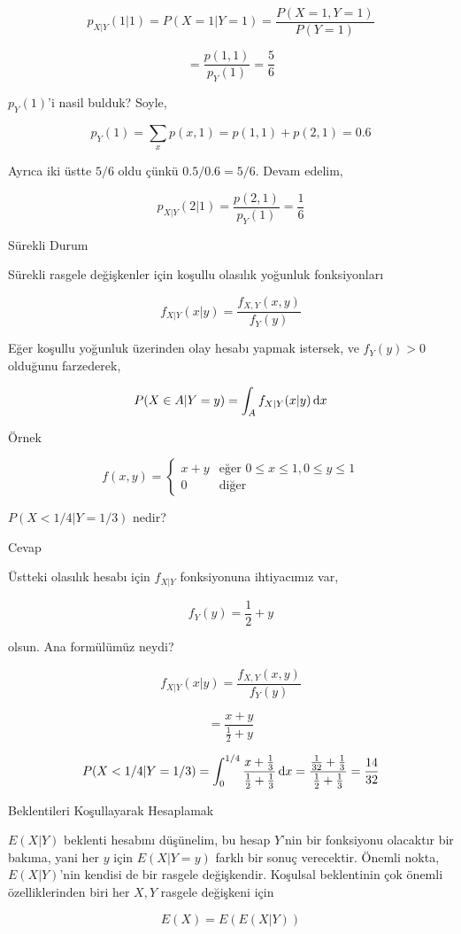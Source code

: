 \documentclass[12pt,fleqn]{article}\usepackage{../../common}
\begin{document}
$$ p_{X|Y}(1|1) = P(X=1|Y=1) = \frac{P(X=1,Y=1)}{P(Y=1)}
$$

$$ = \frac{p(1,1)}{p_Y(1)} = \frac{5}{6} $$

$p_Y(1)$'i nasil bulduk? Soyle,

$$ p_Y(1) = \sum_x p(x,1) = p(1,1) + p(2,1) = 0.6 $$

Ayrıca iki üstte $5/6$ oldu çünkü $0.5/0.6=5/6$. Devam edelim,

$$ p_{X|Y}(2|1) =
\frac{p(2,1)}{p_Y(1)} = \frac{1}{6}
$$

Sürekli Durum

Sürekli rasgele değişkenler için koşullu olasılık yoğunluk fonksiyonları 

$$ f_{X|Y}(x|y) = \frac{ f_{X,Y}(x,y)}{f_Y(y)} $$

Eğer koşullu yoğunluk üzerinden olay hesabı yapmak istersek, ve $f_Y(y) > 0$
olduğunu farzederek,

$$ P(X \in A | Y = y) = \int_A f_{X|Y}(x|y) \,\mathrm{d} x $$

Örnek 

$$ f(x,y) = 
\left\{ \begin{array}{ll}
x+y & \textrm{eğer } 0 \le x \le 1, 0 \le y \le 1 \\
0 & \textrm{diğer}
\end{array} \right.
$$

$P(X < 1/4 | Y = 1/3)$ nedir? 

Cevap 

Üstteki olasılık hesabı için $f_{X|Y}$ fonksiyonuna ihtiyacımız var,

$$ f_Y(y) = \frac{ 1}{2} + y  $$

olsun. Ana formülümüz neydi? 

$$ f_{X|Y}(x|y) = \frac{f_{X,Y}(x,y)}{f_Y(y)} $$

$$ = \frac{ x+y }{\frac{1}{2} + y} $$

$$
P(X < 1/4 | Y = 1/3) = 
\int _{ 0}^{1/4} \frac{ x+ \frac{1}{3} }{\frac{1}{2} + \frac{1 }{3}} \,\mathrm{d} x = 
\frac{\frac{1}{32}+ \frac{1}{3} }{\frac{1}{2} + \frac{1}{3}} = 
\frac{14}{32}
$$

Beklentileri Koşullayarak Hesaplamak

$E(X|Y)$ beklenti hesabını düşünelim, bu hesap $Y$'nin bir fonksiyonu olacaktır
bir bakıma, yani her $y$ için $E(X|Y=y)$ farklı bir sonuç verecektir. Önemli
nokta, $E(X|Y)$'nin kendisi de bir rasgele değişkendir. Koşulsal beklentinin çok
önemli özelliklerinden biri her $X,Y$ rasgele değişkeni için

$$ E(X) = E(E(X|Y)) $$
\end{document}
